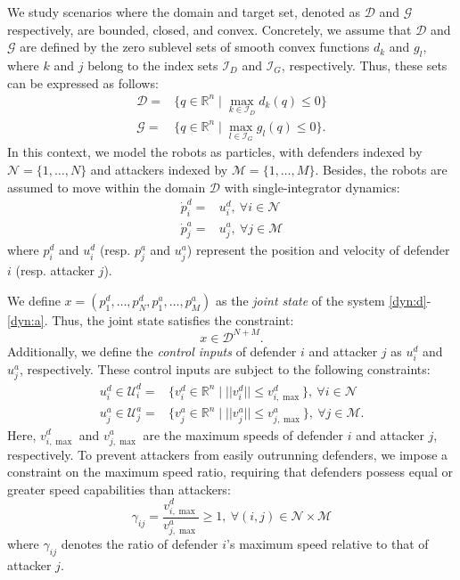 \documentclass[journal]{IEEEtran}
\newcommand{\R}{\mathbb{R}}
\newcommand{\D}{\mathcal{D}}
\newcommand{\G}{\mathcal{G}}
\newcommand{\I}{\mathcal{I}}
\newcommand{\N}{\mathcal{N}}
\newcommand{\M}{\mathcal{M}}
\newcommand{\U}{\mathcal{U}}
\newcommand{\1}{\mathbf{1}}
\begin{document}
We study scenarios where the domain and target set, denoted as $\D$ and $\G$ respectively, are bounded, closed, and convex. Concretely, we assume that $\D$ and $\G$ are defined by the zero sublevel sets of smooth convex functions $d_k$ and $g_l$, where $k$ and $j$ belong to the index sets $\I_D$ and $\I_G$, respectively. Thus, these sets can be expressed as follows:
\begin{align}
    \D=&\{q\in \R^{n}\mid \max_{k\in \I_D}d_k(q)\leq 0\}\label{con:d}\\
    \G=&\{q\in \R^{n}\mid \max_{l\in \I_G}g_l(q)\leq 0\}.\label{con:t}
\end{align}
In this context, we model the robots as particles, with defenders indexed by $\N=\{1,\ldots,N\}$ and attackers indexed by $\M=\{1,\ldots,M\}$. Besides, the robots are assumed to move within the domain $\D$ with single-integrator dynamics:
\begin{align}
    \dot{p}^d_i=&u^d_i,~\forall i\in \N\label{dyn:d}\\
	\dot{p}^a_j=&u^a_j,~\forall j\in \M\label{dyn:a}
\end{align}
where $p^d_i$ and $u^d_i$ (resp. $p^a_j$ and $u^a_j$) represent the position and velocity of defender $i$ (resp. attacker $j$). 

We define $x=(p^d_1,\ldots,p^d_N,p^a_1,\ldots,p^a_M)$ as the \textit{joint state} of the system \eqref{dyn:d}-\eqref{dyn:a}. Thus, the joint state satisfies the constraint:
\begin{equation}\label{con:state}
x\in \D^{N+M}.
\end{equation}
Additionally, we define the \textit{control inputs} of defender $i$ and attacker $j$ as $u^d_i$ and $u^a_j$, respectively. These control inputs are subject to the following constraints:
\begin{align}
    u^d_i\in \U^d_i=& \{v^d_i\in \R^n\mid ||v^d_i||\leq v^d_{i,\max}\},~\forall i\in \N\label{con:d_input}\\
	u^a_j\in \U^a_j=& \{v^a_j\in \R^n\mid ||v^a_j||\leq v^a_{j,\max}\},~\forall j\in \M.\label{con:a_input}
\end{align}
Here, $v^d_{i,\max}$ and $v^a_{j,\max}$ are the maximum speeds of defender $i$ and attacker $j$, respectively. To prevent attackers from easily outrunning defenders, we impose a constraint on the maximum speed ratio, requiring that defenders possess equal or greater speed capabilities than attackers:
\begin{equation}\label{con:ratio}
\gamma_{ij}=\frac{v^d_{i,\max}}{v^a_{j,\max}}\geq1,~\forall (i,j)\in \N\times\M
\end{equation}
where $\gamma_{ij}$ denotes the ratio of defender $i$'s maximum speed relative to that of attacker $j$.
\end{document}
